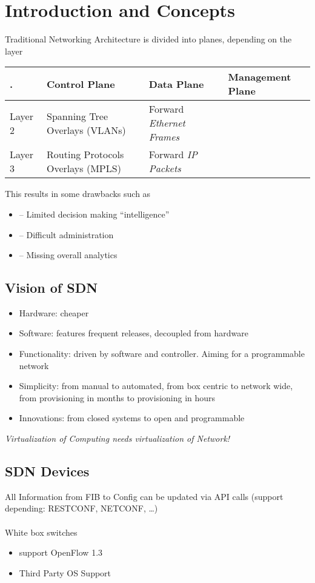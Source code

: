 \section{Introduction and Concepts}
Traditional Networking Architecture is divided into planes, depending on the layer
\begin{table}[h]
	\begin{tabular}{p{}|p{}|p{}|p{}}
		. & Control Plane & Data Plane & Management Plane \\ 
		\hline
		Layer 2 & Spanning Tree Overlays (VLANs) & Forward \emph{Ethernet Frames} & \\ \hline
		Layer 3 & Routing Protocols Overlays (MPLS) & Forward \emph{IP Packets} &
	\end{tabular}
\end{table}

\noindent
This results in some drawbacks such as
\begin{itemize}
	\item -- Limited decision making ``intelligence''
	\item -- Difficult administration
	\item -- Missing overall analytics
\end{itemize}

\subsection{Vision of SDN}
\begin{itemize}
	\item Hardware: cheaper
	\item Software: features frequent releases, decoupled from hardware
	\item Functionality: driven by software and controller. Aiming for a programmable network
	\item Simplicity: from manual to automated, from box centric to network wide, from provisioning in months to provisioning in hours
	\item Innovations: from closed systems to open and programmable
\end{itemize}

\noindent
\emph{Virtualization of Computing needs virtualization of Network!}

\subsection{SDN Devices}
All Information from FIB to Config can be updated via API calls (support depending: RESTCONF, NETCONF, \ldots)
\\
\\
\noindent
White box switches 
\begin{itemize}
	\item support OpenFlow 1.3
	\item Third Party OS Support
\end{itemize}

